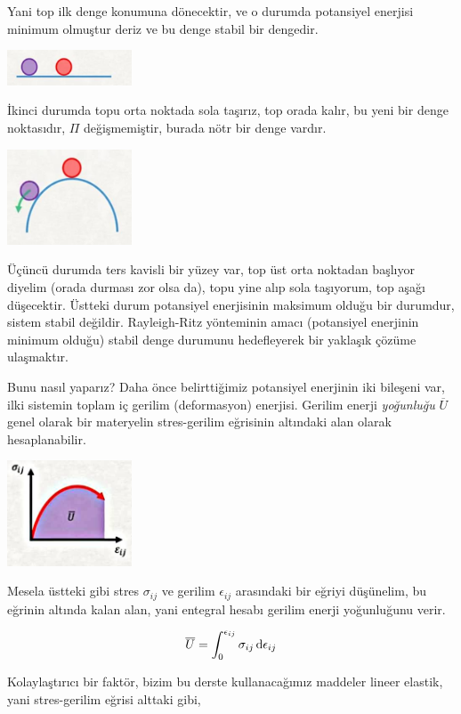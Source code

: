 \documentclass[12pt,fleqn]{article}\usepackage{../../common}
\begin{document}
Yani top ilk denge konumuna dönecektir, ve o durumda potansiyel enerjisi minimum
olmuştur deriz ve bu denge stabil bir dengedir.

\includegraphics[width=10em]{phy_020_strs_04_02.jpg}

İkinci durumda topu orta noktada sola taşırız, top orada kalır, bu yeni
bir denge noktasıdır, $\Pi$ değişmemiştir, burada nötr bir denge vardır.

\includegraphics[width=10em]{phy_020_strs_04_03.jpg}

Üçüncü durumda ters kavisli bir yüzey var, top üst orta noktadan başlıyor
diyelim (orada durması zor olsa da), topu yine alıp sola taşıyorum, top aşağı
düşecektir. Üstteki durum potansiyel enerjisinin maksimum olduğu bir durumdur,
sistem stabil değildir. Rayleigh-Ritz yönteminin amacı (potansiyel enerjinin
minimum olduğu) stabil denge durumunu hedefleyerek bir yaklaşık çözüme
ulaşmaktır.

Bunu nasıl yaparız? Daha önce belirttiğimiz potansiyel enerjinin iki bileşeni
var, ilki sistemin toplam iç gerilim (deformasyon) enerjisi. Gerilim enerji
{\em yoğunluğu} $\overline{U}$ genel olarak bir materyelin stres-gerilim eğrisinin
altındaki alan olarak hesaplanabilir.

\includegraphics[width=10em]{phy_020_strs_04_04.jpg}

Mesela üstteki gibi stres $\sigma_{ij}$ ve gerilim $\epsilon_{ij}$ arasındaki
bir eğriyi düşünelim, bu eğrinin altında kalan alan, yani entegral hesabı 
gerilim enerji yoğunluğunu verir.

$$
\overline{U} = \int_{0}^{\epsilon_{ij}} \sigma_{ij} \,\mathrm{d} \epsilon_{ij}
$$

Kolaylaştırıcı bir faktör, bizim bu derste kullanacağımız maddeler lineer
elastik, yani stres-gerilim eğrisi alttaki gibi,
\end{document}
